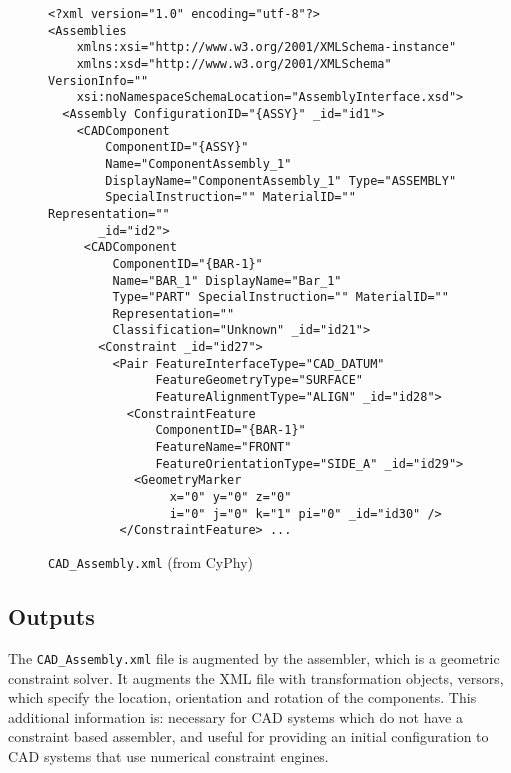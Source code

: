 \documentclass[]{report}
\begin{document}
\begin{figure}
\begin{lstlisting}
<?xml version="1.0" encoding="utf-8"?>
<Assemblies  
    xmlns:xsi="http://www.w3.org/2001/XMLSchema-instance" 
    xmlns:xsd="http://www.w3.org/2001/XMLSchema" VersionInfo=""     
    xsi:noNamespaceSchemaLocation="AssemblyInterface.xsd">
  <Assembly ConfigurationID="{ASSY}" _id="id1">
    <CADComponent  
        ComponentID="{ASSY}" 
        Name="ComponentAssembly_1"
        DisplayName="ComponentAssembly_1" Type="ASSEMBLY"
        SpecialInstruction="" MaterialID="" Representation=""
       _id="id2">
     <CADComponent 
         ComponentID="{BAR-1}" 
         Name="BAR_1" DisplayName="Bar_1"
         Type="PART" SpecialInstruction="" MaterialID=""
         Representation=""
         Classification="Unknown" _id="id21">
       <Constraint _id="id27">
         <Pair FeatureInterfaceType="CAD_DATUM"
               FeatureGeometryType="SURFACE"           
               FeatureAlignmentType="ALIGN" _id="id28">
           <ConstraintFeature 
               ComponentID="{BAR-1}" 
               FeatureName="FRONT"
               FeatureOrientationType="SIDE_A" _id="id29">
            <GeometryMarker 
                 x="0" y="0" z="0" 
                 i="0" j="0" k="1" pi="0" _id="id30" />
          </ConstraintFeature> ...
\end{lstlisting}
\caption{\texttt{CAD\_Assembly.xml} (from CyPhy)}
\end{figure}



\subsection{Outputs} 

The \texttt{CAD\_Assembly.xml} file is augmented by the assembler, which is a geometric constraint solver.  
It augments the XML file with transformation objects, versors, 
which specify the location, orientation and rotation of the components.
This additional information is:
necessary for CAD systems which do not have a constraint based assembler, and
useful for providing an initial configuration to CAD systems that use numerical constraint engines.
\end{document}
